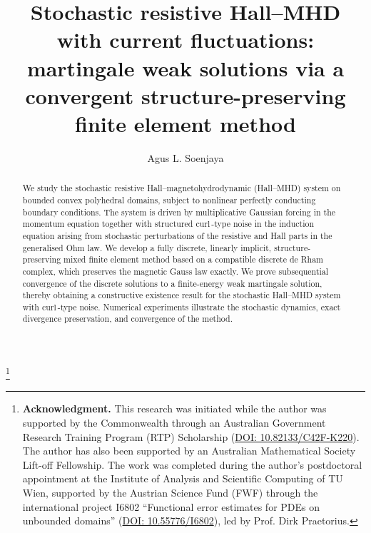 \documentclass[11pt, reqno]{amsart}
\theoremstyle{definition}
\numberwithin{equation}{section}
\newcommand{\curl}{\mathrm{curl}\,}
\begin{document}
\setcounter{page}{1}

\title[Stochastic Hall--MHD: weak solutions via a structure-preserving FEM]{Stochastic resistive Hall--MHD with current fluctuations: martingale weak solutions via a convergent structure-preserving finite element method}


\author[Agus L. Soenjaya]{Agus L. Soenjaya}
\address{Institute of Analysis and Scientific Computing, TU Wien, Wiedner Hauptstrasse 8--10, 1040 Vienna, Austria}
\email{\textcolor[rgb]{0.00,0.00,0.84}{agus.soenjaya@asc.tuwien.ac.at}}

\thanks{\textbf{Acknowledgment.} This research was initiated while the author was supported by the Commonwealth through an Australian Government Research Training Program (RTP) Scholarship (\href{https://doi.org/10.82133/C42F-K220}{DOI: 10.82133/C42F-K220}). The author has also been supported by an Australian Mathematical Society Lift-off Fellowship. The work was completed during the author's postdoctoral appointment at the Institute of Analysis and Scientific Computing of TU Wien, supported by the Austrian Science Fund (FWF) through the international project I6802 ``Functional error estimates for PDEs on unbounded domains'' (\href{https://doi.org/10.55776/I6802}{DOI: 10.55776/I6802}), led by Prof. Dirk Praetorius.}


\begin{abstract}
We study the stochastic resistive Hall--magnetohydrodynamic (Hall--MHD) system on bounded convex polyhedral domains, subject to nonlinear perfectly conducting boundary conditions. The system is driven by multiplicative Gaussian forcing in the momentum equation together with structured $\curl$-type noise in the induction equation arising from stochastic perturbations of the resistive and Hall parts in the generalised Ohm law. We develop a fully discrete, linearly implicit, structure-preserving mixed finite element method based on a compatible discrete de Rham complex, which preserves the magnetic Gauss law exactly. We prove subsequential convergence of the discrete solutions to a finite-energy weak martingale solution, thereby obtaining a constructive existence result for the stochastic Hall--MHD system with $\curl$-type noise. Numerical experiments illustrate the stochastic dynamics, exact divergence preservation, and convergence of the method.
\end{abstract}
\maketitle
\end{document}
